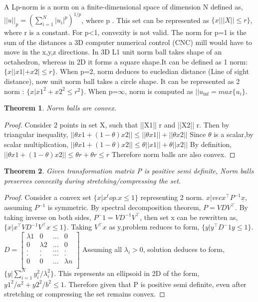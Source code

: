 \documentclass{tufte-handout}
\newtheorem{theorem}{Theorem}
\theoremstyle{remark}
\renewcommand{\vec}[1]{\underline{#1}}
\begin{document}
A Lp-norm is a norm on a finite-dimensional space of dimension N defined as, $||u||_p=(\sum_{i=1}^N|u_i|^p)^{1/p}$, where p . This set can be represented as $\{x| ||X|| \le r\}$, where r is a constant. For p<1, convexity is not valid.
The norm for p=1 is the sum of the distances a 3D computer numerical control (CNC) mill would have to move in the x,y,z directions. In 3D L1 unit norm ball takes shape of an octahedron, whereas in 2D it forms a square shape.It can be defined as 1 norm: $\{x| |x1|+x2| \le r\}$. When p=2, norm deduces to eucledian distance (Line of sight distance), now unit norm ball takes a circle shape. It can be represented as 2 norm : $\{x| x1^2+x2^2 \le r^2\}$.
When p=$\infty$, norm is computed as $||u_\inf=max\{u_i\}$.
\begin{theorem}
Norm balls are convex.
\end{theorem}
\begin{proof}

Consider 2 points in set X, such that ||X1|| \le r and ||X2|| \le r. Then by triangular inequality, 
$||\theta x1+(1-\theta)x2|| \le ||\theta x1||+||\theta x2||$
Since $\theta $ is a scalar,by scalar multiplication,
$||\theta x1+(1-\theta)x2|| \le \theta|| x1||+\theta|| x2||$
By definition,
$||\theta x1+(1-\theta)x2|| \le \theta r+\theta r  \le r$
Therefore norm balls are also convex.
\end{proof}
\begin{theorem}
Given transformation matrix P is positive semi definite, Norm balls preserves convexity during stretching/compressing the set.
\end{theorem}
\begin{proof}
Consider a convex set $\{x| x^top.x \le 1\}$ representing 2 norm. ${x|vec{x}^\top P^{-1} \vec{x}}$, assuming $P^{-1}$ is symmetric. By spectral decomposition theorem, $P=VDV^\top$. By taking inverse on both sides, $P^-1=VD^{-1}V^\top$, then set x can be rewritten as,
$\{x| x^\top VD^{-1}V^\top x \le 1\}$.
Taking $V^\top x$ as y,problem reduces to form, $\{y|y^\top D^-1y \le 1\}$. $D=\begin{bmatrix} 
	\lambda1 & 0&... & 0 \\
	0 & \lambda2 & ...&0\\
	. & . & ...&.\\
	. & . & ...&.\\
	0&0&...&\lambda n\\
	\end{bmatrix}$
	Assuming all $\lambda_i>0$, solution deduces to form,
	$\{y|\sum_{i=1}^N y_i^2/\lambda_i^2 \}$. This represents an ellipsoid in 2D of the form, $y1^2/a^2+y2^2/b^2 \le 1$. Therefore given that P is positive semi definite, even after stretching or compressing the set remains convex.


\end{proof}
\end{document}
